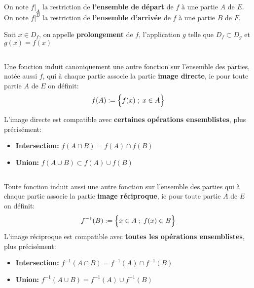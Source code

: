 \subsection*{}

On note \(f|_A\) la restriction de \textbf{l'ensemble de départ} de \(f\) à une partie \(A\) de \(E\).\+
On note \(f|^B\) la restriction de \textbf{l'ensemble d'arrivée} de \(f\) à une partie \(B\) de \(F\).\<

Soit \(x \in D_f\), on appelle \textbf{prolongement} de \(f\), l'application \(g\) telle que \(D_f \subset D_g\) et \(g(x) = f(x)\)
\subsection*{}

Une fonction induit canoniquement une autre fonction sur l'ensemble des parties, notée aussi \( f \), qui à chaque partie associe la partie \textbf{image directe}, ie pour toute partie \(A\) de \(E\) on définit:
\[
    f(A) := \Bigl\{ f(x) \; ; \; x \in A \Bigl\}
\]

L'image directe est compatible avec \textbf{certaines opérations ensemblistes}, plus précisément:
\begin{itemize}
    \item \textbf{Intersection:} \(f(A \cap B) = f(A) \cap f(B)\)
    \item \textbf{Union:} \(f(A \cup B) \subset f(A) \cup f(B)\)
\end{itemize}
\subsection*{}
Toute fonction induit aussi une autre fonction sur l'ensemble des parties qui à chaque partie associe la partie \textbf{image réciproque}, ie pour toute partie \(A\) de \(E\) on définit:
\[
    f^{-1}(B) := \Bigl\{ x \in A \; ; \; f(x) \in B \Bigl\} 
\]
L'image réciproque est compatible avec \textbf{toutes les opérations ensemblistes}, plus précisément:
\begin{itemize}
    \item \textbf{Intersection:} \(f^{-1}(A \cap B) = f^{-1}(A) \cap f^{-1}(B)\)
    \item \textbf{Union:} \(f^{-1}(A \cup B) = f^{-1}(A) \cup f^{-1}(B)\)
\end{itemize}
